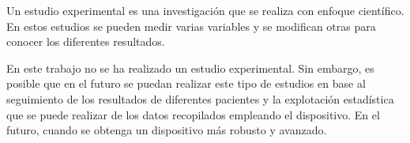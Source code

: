 Un estudio experimental es una investigación que se realiza con enfoque científico. En estos estudios se pueden medir varias variables y se modifican otras para conocer los diferentes resultados.

En este trabajo no se ha realizado un estudio experimental. Sin embargo, es posible que en el futuro se puedan realizar este tipo de estudios en base al seguimiento de los resultados de diferentes pacientes y la explotación estadística que se puede realizar de los datos recopilados empleando el dispositivo. En el futuro, cuando se obtenga un dispositivo más robusto y avanzado.


